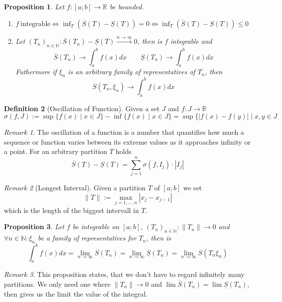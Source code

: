 \documentclass[english,titlepage]{uzhpub}
\theoremstyle{definition}
\newtheorem{definition}{Definition}[section]
\theoremstyle{plain}
\newtheorem{proposition}[definition]{Proposition}
\theoremstyle{remark}
\newtheorem*{remark}{Remark}
\theoremstyle{example}
\begin{document}
   \begin{proposition}\label{pro:integrable}
      Let \(f: [a; b] \to \mathbb{R}\) be bounded.
      \begin{enumerate}[label=\roman*, align=Center]
         \item \(f~\text{integrable} \iff \inf_{T}(\overline{S}(T) - \underline{S}(T)) = 0 \iff \inf_{T}(\overline{S}(T) - \underline{S}(T)) \leq 0\)
            \item Let \((T_n)_{n \in \mathbb{N}}: \overline{S}(T_n) - \underline{S}(T) \xrightarrow{n \to \infty} 0\), then is \(f\) integrable and
               \[\overline{S}(T_n) \to \int_a^b f(x) dx \qquad \underline{S}(T_n) \to \int_a^b f(x) dx\]
               Futhermore if \(\xi_n\) is an arbitrary family of representatives of \(T_n\), then
               \[S(T_n, \xi_n) \to \int_a^b f(x) dx\]
      \end{enumerate}
   \end{proposition}

   \begin{definition}[Oscillation of Function]\label{def:oscillation}
      Given a set \(J\) and \(f: J \to \mathbb{R}\)
      \[\sigma(f, J) := \sup\{f(x) \mid x \in J\} - \inf\{f(x) \mid x \in J\} = \sup\{|f(x) - f(y)| \mid x, y \in J\]
   \end{definition}
   \begin{remark}
      The oscillation of a function is a number that quantifies how much a sequence or function varies between its extreme values as it approaches infinity or a point.
      For an arbitrary partition \(T\) holds
      \[\overline{S}(T) - \underline{S}(T) = \sum_{j=1}^n \sigma(f, I_j) \cdot |I_j|\]
   \end{remark}

   \begin{remark}[Longest Interval]
      Given a partition \(T\) of \([a; b]\) we set
      \[\|T\| := \max_{j = 1, \ldots, n}|x_j - x_{j-1}|\]
      which is the length of the biggest intervall in \(T\).
   \end{remark}

   \begin{proposition}\label{pro:biggest_intervall_converges}
      Let \(f\) be integrable on \([a;b]\), \((T_n)_{n \in \mathbb{N}}: \|T_n\| \to 0\) and \(\forall n \in \mathbb{N}: \xi_n\) be a family of representatives for \(T_n\), then is
      \[\int_a^b f(x) dx = \lim_{n \to \infty} \overline{S}(T_n) = \lim_{n \to \infty} \underline{S}(T_n) = \lim_{n \to \infty} S(T_n \xi_n)\]
   \end{proposition}
   \begin{remark}
      This proposition states, that we don't have to regard infinitely many partitions.
      We only need one where \(\|T_n\| \to 0\) and \(\lim \overline{S}(T_n) = \lim \underline{S}(T_n)\), then gives us the limit the value of the integral.
   \end{remark}
\end{document}
